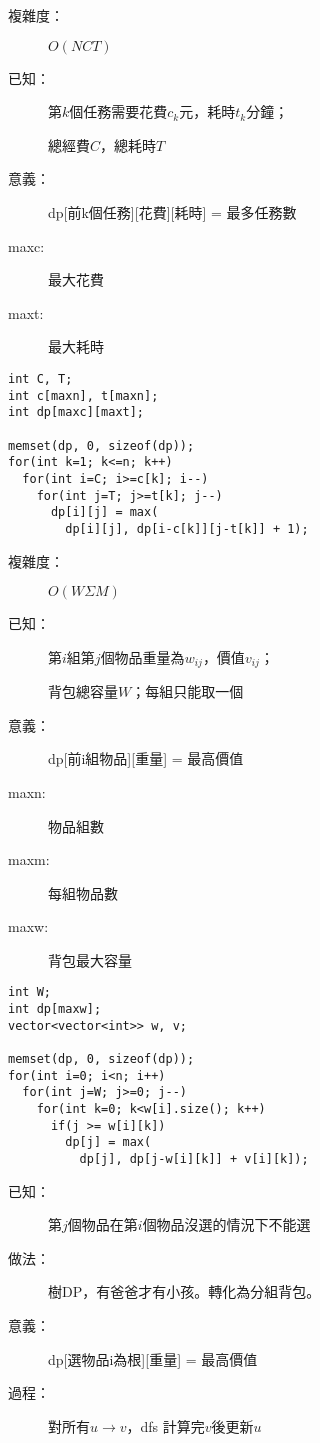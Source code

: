 \begin{center}
  \underline{  \bf{}  }
\end{center}
\begin{description}
  \item[複雜度：] $O(NCT)$
  \item[已知：] 第$k$個任務需要花費$c_k$元，耗時$t_k$分鐘；\par
               總經費$C$，總耗時$T$
  \item[意義：] dp[前k個任務][花費][耗時] = 最多任務數
  \item[maxc:] 最大花費
  \item[maxt:] 最大耗時
\end{description}
\begin{lstlisting}
int C, T;
int c[maxn], t[maxn];
int dp[maxc][maxt];

memset(dp, 0, sizeof(dp));
for(int k=1; k<=n; k++)
  for(int i=C; i>=c[k]; i--)
    for(int j=T; j>=t[k]; j--)
      dp[i][j] = max(
        dp[i][j], dp[i-c[k]][j-t[k]] + 1);
\end{lstlisting}

\begin{center}
  \underline{  \bf{}  }
\end{center}
\begin{description}
  \item[複雜度：] $O(W\Sigma M)$
  \item[已知：] 第$i$組第$j$個物品重量為$w_{ij}$，價值$v_{ij}$；\par
               背包總容量$W$；每組只能取一個
  \item[意義：] dp[前i組物品][重量] = 最高價值
  \item[maxn:] 物品組數
  \item[maxm:] 每組物品數
  \item[maxw:] 背包最大容量
\end{description}
\begin{lstlisting}
int W;
int dp[maxw];
vector<vector<int>> w, v;

memset(dp, 0, sizeof(dp));
for(int i=0; i<n; i++)
  for(int j=W; j>=0; j--)
    for(int k=0; k<w[i].size(); k++)
      if(j >= w[i][k])
        dp[j] = max(
          dp[j], dp[j-w[i][k]] + v[i][k]);
\end{lstlisting}

\begin{center}
  \underline{  \bf{}  }
\end{center}
\begin{description}
  \item[已知：] 第$j$個物品在第$i$個物品沒選的情況下不能選
  \item[做法：] 樹DP，有爸爸才有小孩。轉化為分組背包。
  \item[意義：] dp[選物品i為根][重量] = 最高價值
  \item[過程：] 對所有$u \rightarrow v$，dfs 計算完$v$後更新$u$
\end{description}

